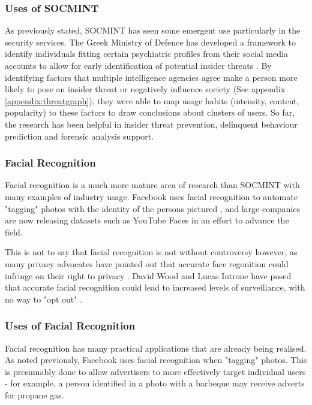 \documentclass{article}
\begin{document}
\subsubsection{Uses of SOCMINT}
As previously stated, SOCMINT has seen some emergent use particularly in the security services. The Greek Ministry of Defence has developed a framework to identify individuals fitting certain psychiatric profiles from their social media accounts to allow for early identification of potential insider threats \citep{behaviourdetection}. By identifying factors that multiple intelligence agencies agree make a person more likely to pose an insider threat or negatively influence society (See appendix \ref{appendix:threatgraph}), they were able to map usage habits (intensity, content, popularity) to these factors to draw conclusions about clusters of users. So far, the research has been helpful in insider threat prevention, delinquent behaviour prediction and forensic analysis support.

\subsubsection{Facial Recognition}
Facial recognition is a much more mature area of research than SOCMINT with many examples of industry usage. Facebook uses facial recognition to automate "tagging" photos with the identity of the persons pictured \citep{facebookfacialrecog}, and large companies are now releasing datasets such as YouTube Faces \citep{faceregiondescriptors} in an effort to advance the field.

This is not to say that facial recognition is not without controversy however, as many privacy advocates have pointed out that accurate face regonition could infringe on their right to privacy \citep{gchqmasssurveillance}. David Wood and Lucas Introne have posed that accurate facial recognition could lead to increased levels of surveillance, with no way to "opt out" \citep{facialrecogpolitics}\citep{facialrecogsecurityvsprivacy}.

\subsubsection{Uses of Facial Recognition}
Facial recognition has many practical applications that are already being realised. As noted previously, Facebook uses facial recognition when "tagging" photos. This is presumably done to allow advertisers to more effectively target individual users - for example, a person identified in a photo with a barbeque may receive adverts for propane gas.
\end{document}
